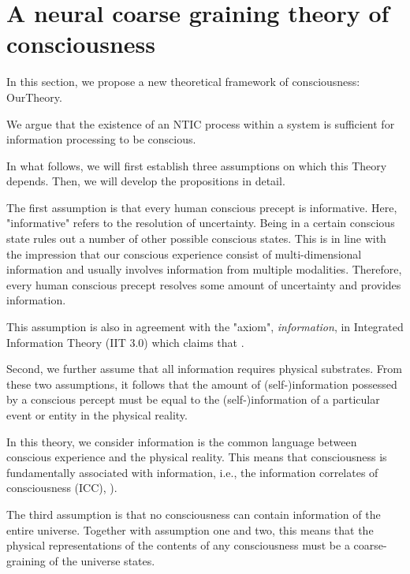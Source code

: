 \documentclass[utf8]{article}
\begin{document}
	\section{A neural coarse graining theory of consciousness}\label{sec:OurTheory}
	


        In this section, we propose a new theoretical framework of consciousness: \acf{OurTheory}.
        
        We argue that the existence of an NTIC process within a system is sufficient for information processing to be conscious.

        In what follows, we will first establish three assumptions on which this Theory depends. Then, we will develop the propositions in detail. 
    
        The first assumption is that every human conscious precept is informative. Here, "informative" refers to the resolution of uncertainty. Being in a certain conscious state rules out a  number of other possible conscious states. This is in line with the impression that our conscious experience consist of multi-dimensional information and usually involves information from multiple modalities. Therefore, every human conscious precept resolves some amount of uncertainty and provides information.  
        
        This assumption is also in agreement with the "axiom", \textit{information}, in Integrated Information Theory (IIT 3.0) which claims that  \citep[p. 2]{oizumi2014phenomenology}.
        
        Second, we further assume that all information requires physical substrates. 
        From these two assumptions, it follows that the amount of (self-)information possessed by a conscious percept must be equal to the (self-)information of a particular event or entity in the physical reality. 
        
        In this theory, we consider information is the common language between conscious experience and the physical reality. This means that consciousness is fundamentally associated with information, i.e., the information correlates of consciousness (ICC), \cite{chalmers1996conscious, tononi2004information, gamez2011information, Gamez2016}).
        
        The third assumption is that no consciousness can contain information of the entire universe. Together with assumption one and two, this means that the physical representations of the contents of any consciousness must be a coarse-graining of the universe states. 
        
\end{document}
